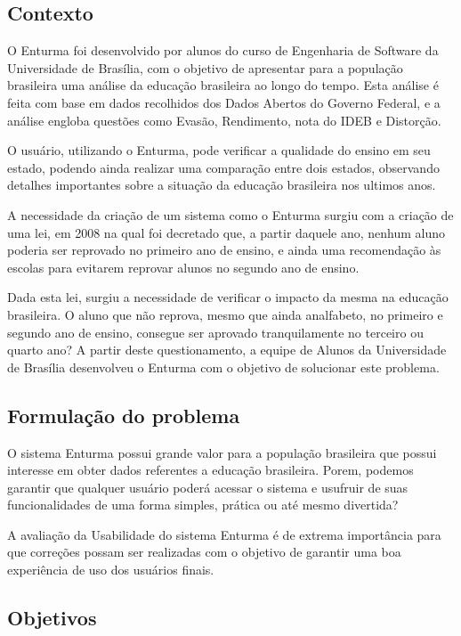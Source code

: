 \subsection{Contexto}
	

	O Enturma foi desenvolvido por alunos do curso de Engenharia de Software da Universidade de Brasília, com o objetivo de apresentar para a população brasileira uma análise da educação brasileira ao longo do tempo. Esta análise é feita com base em dados recolhidos dos Dados Abertos do Governo Federal, e a análise engloba questões como Evasão, Rendimento, nota do IDEB e Distorção.

	O usuário, utilizando o Enturma, pode verificar a qualidade do ensino em seu estado, podendo ainda realizar uma comparação entre dois estados, observando detalhes importantes sobre a situação da educação brasileira nos ultimos anos.

	A necessidade da criação de um sistema como o Enturma surgiu com a criação de uma lei, em 2008 na qual foi decretado que, a partir daquele ano, nenhum aluno poderia ser reprovado no primeiro ano de ensino, e ainda uma recomendação às escolas para evitarem reprovar alunos no segundo ano de ensino.

	Dada esta lei, surgiu a necessidade de verificar o impacto da mesma na educação brasileira. O aluno que não reprova, mesmo que ainda analfabeto, no primeiro e segundo ano de ensino, consegue ser aprovado tranquilamente no terceiro ou quarto ano? A partir deste questionamento, a equipe de Alunos da Universidade de Brasília desenvolveu o Enturma com o objetivo de solucionar este problema.

\subsection{Formulação do problema}
	
	O sistema Enturma possui grande valor para a população brasileira que possui interesse em obter dados referentes a educação brasileira. Porem, podemos garantir que qualquer usuário poderá acessar o sistema e usufruir de suas funcionalidades de uma forma simples, prática ou até mesmo divertida? 

	A avaliação da Usabilidade do sistema Enturma é de extrema importância para que correções possam ser realizadas com o objetivo de garantir uma boa experiência de uso dos usuários finais.

\subsection{Objetivos}

